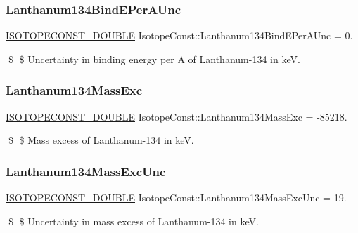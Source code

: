 \subsubsection{\texorpdfstring{Lanthanum134\+Bind\+E\+Per\+A\+Unc}{Lanthanum134BindEPerAUnc}}
{\footnotesize\ttfamily \mbox{\hyperlink{group___isotope_const-_macros_ga8f45a7272ce02c0b4c65c44636ed719a}{I\+S\+O\+T\+O\+P\+E\+C\+O\+N\+S\+T\+\_\+\+D\+O\+U\+B\+LE}} Isotope\+Const\+::\+Lanthanum134\+Bind\+E\+Per\+A\+Unc = 0.}

\$ \$ Uncertainty in binding energy per A of Lanthanum-\/134 in keV. \mbox{\label{group___isotope_const-_lanthanum-_la134_gad2676bd2749b149af3bc99a2337ef3a5}} 
\subsubsection{\texorpdfstring{Lanthanum134\+Mass\+Exc}{Lanthanum134MassExc}}
{\footnotesize\ttfamily \mbox{\hyperlink{group___isotope_const-_macros_ga8f45a7272ce02c0b4c65c44636ed719a}{I\+S\+O\+T\+O\+P\+E\+C\+O\+N\+S\+T\+\_\+\+D\+O\+U\+B\+LE}} Isotope\+Const\+::\+Lanthanum134\+Mass\+Exc = -\/85218.}

\$ \$ Mass excess of Lanthanum-\/134 in keV. \mbox{\label{group___isotope_const-_lanthanum-_la134_ga2ffedbb0a032c582b951a318a83ff84e}} 
\subsubsection{\texorpdfstring{Lanthanum134\+Mass\+Exc\+Unc}{Lanthanum134MassExcUnc}}
{\footnotesize\ttfamily \mbox{\hyperlink{group___isotope_const-_macros_ga8f45a7272ce02c0b4c65c44636ed719a}{I\+S\+O\+T\+O\+P\+E\+C\+O\+N\+S\+T\+\_\+\+D\+O\+U\+B\+LE}} Isotope\+Const\+::\+Lanthanum134\+Mass\+Exc\+Unc = 19.}

\$ \$ Uncertainty in mass excess of Lanthanum-\/134 in keV. \mbox{\label{group___isotope_const-_lanthanum-_la134_ga920aecdbfa8e17f24810e5905db42f9e}} 
